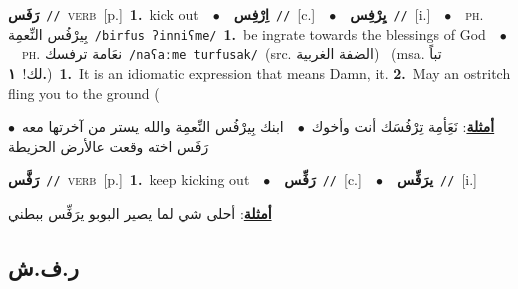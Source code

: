 \documentclass[10pt,a4paper,twoside]{article} %
\begin{document}
\begin{multicols}{2}
{\setlength\topsep{0pt}\textbf{\foreignlanguage{arabic}{رَفَس}}\ {\color{gray}\texttt{//}\color{black}}\ \textsc{verb}\ [p.]\ \textbf{1.}~kick out\ \ $\bullet$\ \ \setlength\topsep{0pt}\textbf{\foreignlanguage{arabic}{اِرْفِس}}\ {\color{gray}\texttt{//}\color{black}}\ [c.]\ \ $\bullet$\ \ \setlength\topsep{0pt}\textbf{\foreignlanguage{arabic}{يِرْفِس}}\ {\color{gray}\texttt{//}\color{black}}\ [i.]\ \ $\bullet$\ \ \textsc{ph.} \color{gray} \foreignlanguage{arabic}{بِيرْفُس النِّعمِة}\color{black}\ {\color{gray}\texttt{/{\sffamily birfus ʔinniʕme}/}\color{black}}\ \textbf{1.}~be ingrate towards the blessings of God\ \ $\bullet$\ \ \textsc{ph.} \color{gray} \foreignlanguage{arabic}{نعَامة ترفسك}\color{black}\ {\color{gray}\texttt{/{\sffamily naʕaːme turfusak}/}\color{black}}\ \color{gray}(src. \foreignlanguage{arabic}{الضفة الغربية})\color{black}\ \color{gray} (msa. \foreignlanguage{arabic}{تباً لك!}~\foreignlanguage{arabic}{\textbf{١.}})\color{black}\ \textbf{1.}~It is an idiomatic expression that means Damn, it.  \textbf{2.}~May an ostritch fling you to the ground (\  \begin{flushright}\color{gray}\foreignlanguage{arabic}{\textbf{\underline{\foreignlanguage{arabic}{أمثلة}}}: نَعَِأمِة تِرْفُسَك أنت وأخوك\ $\bullet$\ \  ابنك بِيرْفُس النِّعمِة والله يستر من آخرتها معه\ $\bullet$\ \  رَفَس اخته وقعت عالأرض الحزيطة}\end{flushright}\color{black}} \vspace{2mm}

{\setlength\topsep{0pt}\textbf{\foreignlanguage{arabic}{رَفَّس}}\ {\color{gray}\texttt{//}\color{black}}\ \textsc{verb}\ [p.]\ \textbf{1.}~keep kicking out\ \ $\bullet$\ \ \setlength\topsep{0pt}\textbf{\foreignlanguage{arabic}{رَفِّس}}\ {\color{gray}\texttt{//}\color{black}}\ [c.]\ \ $\bullet$\ \ \setlength\topsep{0pt}\textbf{\foreignlanguage{arabic}{يرَفِّس}}\ {\color{gray}\texttt{//}\color{black}}\ [i.]\  \begin{flushright}\color{gray}\foreignlanguage{arabic}{\textbf{\underline{\foreignlanguage{arabic}{أمثلة}}}: أحلى شي لما يصير البوبو يرَفِّس ببطني}\end{flushright}\color{black}} \vspace{2mm}

\vspace{-3mm}
\subsection*{\color{blue}\foreignlanguage{arabic}{ر.ف.ش}\color{blue}{}} 


\end{multicols}
\end{document}
